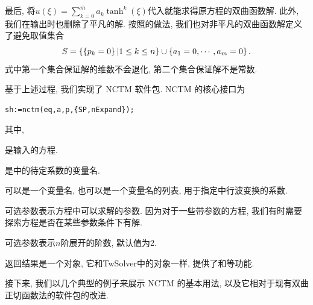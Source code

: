 最后, 将$u(\xi)=\sum_{k=0}^{\overline{m}}{a_k \tanh^k(\xi)}$代入就能求得原方程的双曲函数解.  此外, 我们在输出时也删除了平凡的解. 按照的做法, 我们也对非平凡的双曲函数解定义了避免取值集合
\begin{equation}
    S=\left\{\left\{p_k=0\right\}|1\le k \le n\right\} \cup \left\{a_1=0,\cdots,a_m=0\right\}.
\end{equation}
式中第一个集合保证解的维数不会退化, 第二个集合保证解不是常数. 

基于上述过程, 我们实现了 NCTM 软件包. NCTM 的核心接口为
\begin{verbatim}
sh:=nctm(eq,a,p,{SP,nExpand});
\end{verbatim}
其中,
\begin{compactitem}[\textbullet]
\item {} 是输入的方程.
\item {} 是中的待定系数的变量名.
\item {} 可以是一个变量名, 也可以是一个变量名的列表, 用于指定中行波变换的系数.
\item 可选参数表示方程中可以求解的参数. 因为对于一些带参数的方程, 我们有时需要探索方程是否在某些参数条件下有解.
\item 可选参数表示$n$阶展开的阶数, 默认值为2.
\item 返回结果是一个对象, 它和TwSolver中的对象一样, 提供了\D {}和等功能. 
\end{compactitem}

接下来, 我们以几个典型的例子来展示 NCTM 的基本用法, 以及它相对于现有双曲正切函数法的软件包的改进. 

